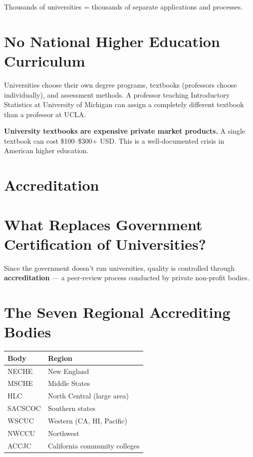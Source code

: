 Thousands of universities = thousands of separate applications and processes.

\section{No National Higher Education Curriculum}

Universities choose their own degree programs, textbooks (professors choose individually), and assessment methods. A professor teaching Introductory Statistics at University of Michigan can assign a completely different textbook than a professor at UCLA.

\textbf{University textbooks are expensive private market products.} A single textbook can cost \$100--\$300+ USD. This is a well-documented crisis in American higher education.

\section{Accreditation}

\section{What Replaces Government Certification of Universities?}

Since the government doesn't run universities, quality is controlled through \textbf{accreditation} --- a peer-review process conducted by private non-profit bodies.

\section{The Seven Regional Accrediting Bodies}


\begin{center}\small
	\begin{tabularx}{0.85\textwidth}{@{} l X @{}}
		\toprule
		\textbf{Body} & \textbf{Region}               \\
		\midrule
		NECHE         & New England                   \\
		MSCHE         & Middle States                 \\
		HLC           & North Central (large area)    \\
		SACSCOC       & Southern states               \\
		WSCUC         & Western (CA, HI, Pacific)     \\
		NWCCU         & Northwest                     \\
		ACCJC         & California community colleges \\
		\bottomrule
	\end{tabularx}
\end{center}



